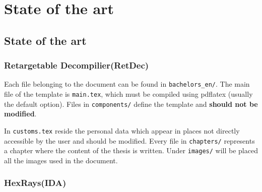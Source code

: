 \chapter{State of the art}\label{section:stateoftheart}
\thispagestyle{pagestyle}


\section{State of the art}
\subsection{Retargetable Decompilier(RetDec)} \label{section:retdec}
Each file belonging to the document can be found in \texttt{bachelors\_en/}.
The main file of the template is \texttt{main.tex}, which must be compiled using pdflatex (usually the default option). Files in \texttt{components/} define the template and \textbf{should not be modified}.

In \texttt{customs.tex} reside the personal data which appear in places not directly accessible by the user and should be modified. Every file in \texttt{chapters/} represents a chapter where the content of the thesis is written. Under \texttt{images/} will be placed all the images used in the document.

\subsection{HexRays(IDA)} \label{section:hexrays}
